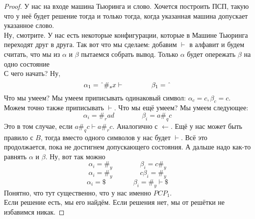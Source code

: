 \documentclass{article}
\begin{document}
    \begin{proof}
        У нас на входе машина Тьюринга и слово. Хочется построить ПСП, такую что у неё будет решение тогда и только тогда, когда указанная машина допускает указанное слово.\\
        Ну, смотрите. У нас есть некоторые конфигурации, которые в Машине Тьюринга переходят друг в друга. Так вот что мы сделаем: добавим $\vdash$ в алфавит и будем считать, что мы из $\alpha$ и $\beta$ пытаемся собрать вывод. Только $\alpha$ будет опережать $\beta$ на одно состояние\\
        С чего начать? Ну,
        $$\alpha_1=\char`\^\#_sx\vdash\qquad\qquad\beta_1=\char`\^ $$
        Что мы умеем? Мы умеем приписывать одинаковый символ: $\alpha_c=c,\beta_c=c$. Можем точно также приписывать $\vdash$. Что мы ещё умеем? Мы умеем следующее:
        $$\alpha_i=\#_rad\qquad\qquad \beta_i=a\#_qc$$
        Это в том случае, если $a\#_qc\vdash a\#_rc$. Аналогично с $\leftarrow$. Ещё у нас может быть правило с $B$, тогда вместо одного символов у нас будет $\vdash$. Всё это продолжается, пока не достигнем допускающего состояния. А дальше надо как-то равнять $\alpha$ и $\beta$. Ну, вот так можно
        $$
        \alpha_i=\#_y\qquad\qquad\beta_i=c\#_y
        $$
        $$
        \alpha_i=\#_y\qquad\qquad c\beta_i=\#_y
        $$
        $$
        \alpha_i=\$\qquad\qquad \beta_i=\#_y\vdash\$
        $$
        Понятно, что тут существенно, что у нас именно $PCP_1$.\\
        Если решение есть, мы его найдём. Если решения нет, мы от решётки не избавимся никак.
    \end{proof}
\end{document}
